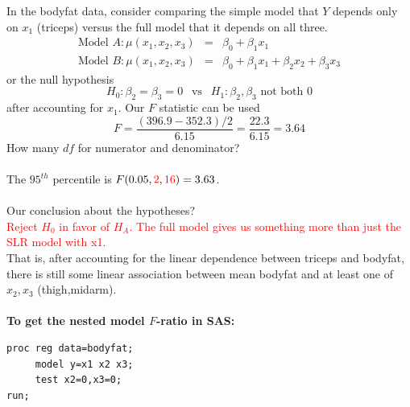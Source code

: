 \documentclass{article}
\begin{document}
In the bodyfat data, consider comparing the simple model that $Y$ depends only on $x_1$ (triceps) versus the full model that it depends on all three.
\begin{eqnarray*}
\mbox{Model } A: \mu(x_1,x_2,x_3) & = & \beta_0 + \beta_1 x_1 \\
\mbox{Model } B: \mu(x_1,x_2,x_3) & = & \beta_0 + \beta_1 x_1 + \beta_2 x_2 + \beta_3 x_3 
\end{eqnarray*} 
or the null hypothesis 
$$H_0: \beta_2=\beta_3=0 \ \ \mbox{  vs  } \ \ H_1: \beta_2, \beta_3 \mbox{ not both }0$$ 
after accounting for $x_1$.
Our $F$ statistic can be used
$$ F = \frac{(396.9-352.3)/2}{6.15} = \frac{22.3}{6.15}=3.64$$
How many $df$ for numerator and denominator? \\~\\
The $95^{th}$ percentile is $F(0.05,\textcolor{red}{2} ,\textcolor{red}{16}) = 3.63$.\\~\\
Our conclusion about the hypotheses?\\
\textcolor{red}{Reject $H_0$ in favor of $H_A$.  The full model gives us something more than just the SLR model with x1.}\\
That is, after accounting for the linear dependence between triceps and bodyfat, there is still some linear association between mean bodyfat and at least one of $x_2,x_3$ (thigh,midarm).  \\~\\

\textbf{To get the nested model $F$-ratio in SAS:}
\begin{small}
\begin{verbatim}
proc reg data=bodyfat;
     model y=x1 x2 x3;
     test x2=0,x3=0;
run;
\end{verbatim}
\end{small}
\end{document}
